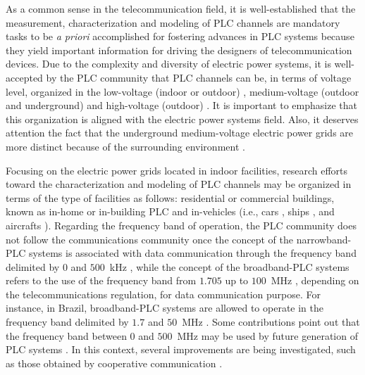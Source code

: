 As a common sense in the telecommunication field, it is well-established that the measurement, characterization and modeling of \ac{PLC} channels are mandatory tasks to be \textit{a priori} accomplished for fostering advances in \ac{PLC} systems because they yield important information for driving the designers of telecommunication devices. Due to the complexity and diversity of electric power systems, it is well-accepted by the \ac{PLC} community that \ac{PLC} channels can be, in terms of voltage level, organized in the low-voltage (indoor or outdoor) \cite{Zhai:low}, medium-voltage (outdoor and underground) \cite{Lazaropoulos} and high-voltage (outdoor) \cite{Zajc}. It is important to emphasize that this organization is aligned with the electric power systems field. Also, it deserves attention the fact that the underground medium-voltage electric power grids are more distinct because of the surrounding environment \cite{Aquilue}. 

Focusing on the electric power grids located in indoor facilities, research efforts toward the characterization and modeling of \ac{PLC} channels may be organized in terms of the type of facilities as follows: residential or commercial buildings, known as in-home or in-building \ac{PLC} \cite{Amirshahi:PLC,Tlich:Indoor} and in-vehicles (i.e., cars \cite{Vallejo:Vehicle_PLC}, ships \cite{Barmada:Ships_PLC}, and aircrafts \cite{Jones:Aircraft_PLC,Andrei:Meas,Andrey2016}). Regarding the frequency band of operation, the \ac{PLC} community does not follow the communications community once the concept of the narrowband-\ac{PLC} systems is associated with data communication through the frequency band delimited by $0$ and $500$~kHz \cite{Gassara:Charac_PLC,Chrysochos:MIMO_OFDM}, while the concept of the broadband-\ac{PLC} systems refers to the use of the frequency band from $1.705$ up to $100$~MHz \cite{Tlich:Indoor,Galli:Wireline}, depending on the telecommunications regulation, for data communication purpose. For instance, in Brazil, broadband-\ac{PLC} systems are allowed to operate in the frequency band delimited by $1.7$ and $50$~MHz \cite{Anatel:PLC}. Some contributions point out that the frequency band between $0$ and $500$~MHz may be used by future generation of \ac{PLC} systems \cite{Luis:doc,zeddam1}. In this context, several improvements are being investigated, such as those obtained by cooperative communication \cite{mateus:2018,Michelle2016,Michele:mt,Valencia2014, Roberto2015}. 

